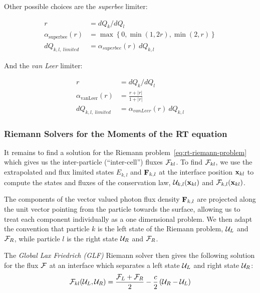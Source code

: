 Other possible choices are the \emph{superbee} limiter:

\begin{align}
	r &= dQ_k / dQ_l \nonumber \\
	\alpha_{\text{superbee}}(r) &= \max \left\{ 0,  \min (1, 2r), \min(2, r) \right\}
	\label{eq:rt-superbee}\\
	dQ_{k,l,\ limited} &= \alpha_{superbee}(r)\ dQ_{k,l} \nonumber
\end{align}


And the \emph{van Leer} limiter:

\begin{align}
	r &= dQ_k / dQ_l \nonumber\\
	\alpha_{\text{vanLeer}}(r) &= \frac{r + |r|}{1 + |r|}
	\label{eq:rt-vanLeer}\\
	dQ_{k,l,\ limited} &= \alpha_{vanLeer}(r)\ dQ_{k,l} \nonumber
\end{align}








\subsubsection{Riemann Solvers for the Moments of the RT equation}\label{chap:riemann-rt}

It remains to find a solution for the Riemann problem~\ref{eq:rt-riemann-problem} which gives us
the inter-particle (``inter-cell'') fluxes $\mathcal{F}_{kl}$. To find $\mathcal{F}_{kl}$, we use the extrapolated and
flux limited states $E_{k,l}$ and $\mathbf{F}_{k,l}$ at the interface position $\mathbf{x}_{kl}$ to compute the
states and fluxes of the conservation law, $\mathcal{U}_{k,l}(\mathbf{x}_{kl})$ and $\mathcal{F}_{k,l}(\mathbf{x}_{kl})$.

The components of the vector valued photon flux density $\mathbf{F}_{k,l}$ are projected along the unit
vector pointing from the particle towards the surface, allowing us to treat each component
individually as a one dimensional problem. We then adapt the convention that particle $k$ is the
left state of the Riemann problem, $\mathcal{U}_L$ and $\mathcal{F}_R$, while particle $l$ is the right state $\mathcal{U}_R$
and $\mathcal{F}_R$.

The \emph{Global Lax Friedrich (GLF)} Riemann solver \citep{ramses-rt13} then gives the
following solution for the flux $\mathcal{F}$ at an interface which separates a left state $\mathcal{U}_L$
and right state $\mathcal{U}_R$:
\begin{equation}
	\mathcal{F}_{kl}(\mathcal{U}_L, \mathcal{U}_R) =
		\frac{\mathcal{F}_{L} + \mathcal{F}_{R}}{2} -
		\frac{c}{2} \left(\mathcal{U}_R - \mathcal{U}_L \right) \label{eq:riemann-GLF}
\end{equation}

